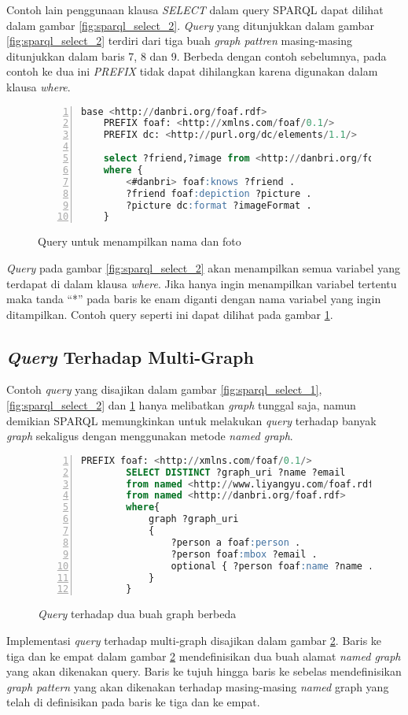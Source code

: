 Contoh lain penggunaan klausa \emph{SELECT} dalam query SPARQL dapat dilihat dalam gambar \ref{fig:sparql_select_2}. \emph{Query} yang ditunjukkan dalam gambar \ref{fig:sparql_select_2} terdiri dari tiga buah \emph{graph pattren} masing-masing ditunjukkan dalam baris 7, 8 dan 9. Berbeda dengan contoh sebelumnya, pada contoh ke dua ini \emph{PREFIX} tidak dapat dihilangkan karena digunakan dalam klausa \emph{where}. 

\begin{figure}[hb]
	\centering
	\begin{lstlisting}[language=SQL,numbers=left]
	base <http://danbri.org/foaf.rdf>
	PREFIX foaf: <http://xmlns.com/foaf/0.1/>
	PREFIX dc: <http://purl.org/dc/elements/1.1/>

	select ?friend,?image from <http://danbri.org/foaf.rdf>
	where {
		<#danbri> foaf:knows ?friend .
		?friend foaf:depiction ?picture .
		?picture dc:format ?imageFormat .
	}\end{lstlisting}
	\caption{Query untuk menampilkan nama dan foto}
	\label{fig:sparql_select_3}
\end{figure}

\emph{Query} pada gambar \ref{fig:sparql_select_2} akan menampilkan semua variabel yang terdapat di dalam klausa \emph{where}. Jika hanya ingin menampilkan variabel tertentu maka tanda ``*'' pada baris ke enam diganti dengan nama variabel yang ingin ditampilkan. Contoh query seperti ini dapat dilihat pada gambar \ref{fig:sparql_select_3}.

\subsection{\emph{Query} Terhadap Multi-Graph}
Contoh \emph{query} yang disajikan dalam gambar \ref{fig:sparql_select_1}, \ref{fig:sparql_select_2} dan \ref{fig:sparql_select_3} hanya melibatkan \emph{graph} tunggal saja, namun demikian SPARQL memungkinkan untuk melakukan \emph{query} terhadap banyak \emph{graph} sekaligus dengan menggunakan metode \emph{named graph}.

\begin{figure}[ht]
	\centering
	\begin{lstlisting}[language=SQL, numbers=left]
		PREFIX foaf: <http://xmlns.com/foaf/0.1/>
		SELECT DISTINCT ?graph_uri ?name ?email
		from named <http://www.liyangyu.com/foaf.rdf>
		from named <http://danbri.org/foaf.rdf>
		where{
			graph ?graph_uri
			{
				?person a foaf:person .
				?person foaf:mbox ?email .
				optional { ?person foaf:name ?name .}
			}
		}
	\end{lstlisting}
	\caption{\emph{Query} terhadap dua buah graph berbeda \citep{liyang_yu}}
	\label{fig:multi_graph_query}
\end{figure}

Implementasi \emph{query} terhadap multi-graph disajikan dalam gambar \ref{fig:multi_graph_query}. Baris ke tiga dan ke empat dalam gambar \ref{fig:multi_graph_query} mendefinisikan dua buah alamat \emph{named graph} yang akan dikenakan query. Baris ke tujuh hingga baris ke sebelas mendefinisikan \emph{graph pattern} yang akan dikenakan terhadap masing-masing \emph{named} graph yang telah di definisikan pada baris ke tiga dan ke empat.